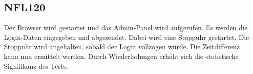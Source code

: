 \subsection*{NFL120}

Der Browser wird gestartet und das Admin-Panel wird aufgerufen.
Es werden die Login-Daten eingegeben und abgesendet. Dabei wird eine Stoppuhr gestartet.
Die Stoppuhr wird angehalten, sobald der Login vollzogen wurde.
Die Zeitdifferenz kann nun ermittelt werden.
Durch Wiederholungen erhöht sich die statistische Signifikanz des Tests.
